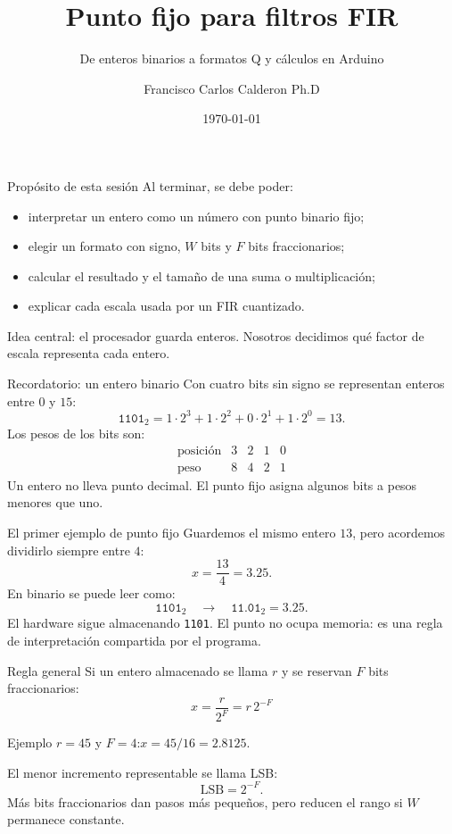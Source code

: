 \documentclass[aspectratio=169,10pt]{beamer}
\title{Punto fijo para filtros FIR}
\subtitle{De enteros binarios a formatos Q y cálculos en Arduino}
\author{Francisco Carlos Calderon Ph.D}
\date{\today}
\begin{document}
\begin{frame}
  \titlepage
\end{frame}

\begin{frame}{Propósito de esta sesión}
  Al terminar, se debe poder:
  \begin{itemize}
    \item interpretar un entero como un número con punto binario fijo;
    \item elegir un formato con signo, $W$ bits y $F$ bits fraccionarios;
    \item calcular el resultado y el tamaño de una suma o multiplicación;
    \item explicar cada escala usada por un FIR cuantizado.
  \end{itemize}
  \vfill
  \alert{Idea central:} el procesador guarda enteros. Nosotros decidimos qué
  factor de escala representa cada entero.
\end{frame}

\begin{frame}{Recordatorio: un entero binario}
  Con cuatro bits sin signo se representan enteros entre $0$ y $15$:
  \[
    \texttt{1101}_2 = 1\cdot 2^3+1\cdot 2^2+0\cdot 2^1+1\cdot 2^0=13.
  \]
  Los pesos de los bits son:
  \[
    \begin{array}{c|cccc}
    \text{posición} & 3 & 2 & 1 & 0\\ \hline
    \text{peso} & 8 & 4 & 2 & 1
    \end{array}
  \]
  Un entero no lleva punto decimal. El punto fijo asigna algunos bits a pesos
  menores que uno.
\end{frame}

\begin{frame}{El primer ejemplo de punto fijo}
  Guardemos el mismo entero $13$, pero acordemos dividirlo siempre entre $4$:
  \[
    x=\frac{13}{4}=3.25.
  \]
  En binario se puede leer como:
  \[
    \texttt{1101}_2 \quad\longrightarrow\quad \texttt{11.01}_2=3.25.
  \]
  El hardware sigue almacenando \texttt{1101}. El punto no ocupa memoria: es
  una regla de interpretación compartida por el programa.
\end{frame}

\begin{frame}{Regla general}
  Si un entero almacenado se llama $r$ y se reservan $F$ bits fraccionarios:
  \[
    \boxed{x=\frac{r}{2^F}=r\,2^{-F}}
  \]
  \begin{exampleblock}{Ejemplo}
    $r=45$ y $F=4$:\quad $x=45/16=2.8125$.
  \end{exampleblock}
  El menor incremento representable se llama \alert{LSB}:
  \[
    \mathrm{LSB}=2^{-F}.
  \]
  Más bits fraccionarios dan pasos más pequeños, pero reducen el rango si $W$
  permanece constante.
\end{frame}
\end{document}
